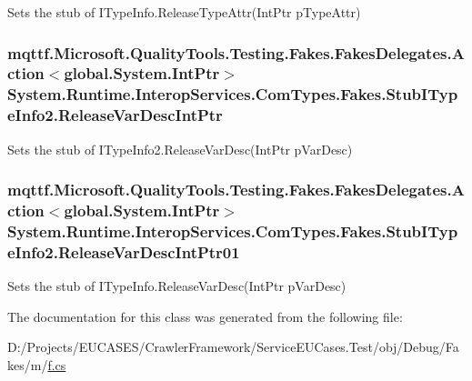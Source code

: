 Sets the stub of I\-Type\-Info.\-Release\-Type\-Attr(\-Int\-Ptr p\-Type\-Attr)

\hypertarget{class_system_1_1_runtime_1_1_interop_services_1_1_com_types_1_1_fakes_1_1_stub_i_type_info2_a75be579e4ef3a6c2a0ac4fc3764b92a9}{
\subsubsection[{Release\-Var\-Desc\-Int\-Ptr}]{\setlength{\rightskip}{0pt plus 5cm}mqttf.\-Microsoft.\-Quality\-Tools.\-Testing.\-Fakes.\-Fakes\-Delegates.\-Action$<$global.\-System.\-Int\-Ptr$>$ System.\-Runtime.\-Interop\-Services.\-Com\-Types.\-Fakes.\-Stub\-I\-Type\-Info2.\-Release\-Var\-Desc\-Int\-Ptr}}\label{class_system_1_1_runtime_1_1_interop_services_1_1_com_types_1_1_fakes_1_1_stub_i_type_info2_a75be579e4ef3a6c2a0ac4fc3764b92a9}


Sets the stub of I\-Type\-Info2.\-Release\-Var\-Desc(\-Int\-Ptr p\-Var\-Desc)

\hypertarget{class_system_1_1_runtime_1_1_interop_services_1_1_com_types_1_1_fakes_1_1_stub_i_type_info2_a44cfbb6ffccd0f74fb1a6152d65ae9fa}{
\subsubsection[{Release\-Var\-Desc\-Int\-Ptr01}]{\setlength{\rightskip}{0pt plus 5cm}mqttf.\-Microsoft.\-Quality\-Tools.\-Testing.\-Fakes.\-Fakes\-Delegates.\-Action$<$global.\-System.\-Int\-Ptr$>$ System.\-Runtime.\-Interop\-Services.\-Com\-Types.\-Fakes.\-Stub\-I\-Type\-Info2.\-Release\-Var\-Desc\-Int\-Ptr01}}\label{class_system_1_1_runtime_1_1_interop_services_1_1_com_types_1_1_fakes_1_1_stub_i_type_info2_a44cfbb6ffccd0f74fb1a6152d65ae9fa}


Sets the stub of I\-Type\-Info.\-Release\-Var\-Desc(\-Int\-Ptr p\-Var\-Desc)



The documentation for this class was generated from the following file\-:\begin{DoxyCompactItemize}
\item 
D\-:/\-Projects/\-E\-U\-C\-A\-S\-E\-S/\-Crawler\-Framework/\-Service\-E\-U\-Cases.\-Test/obj/\-Debug/\-Fakes/m/\hyperlink{m_2f_8cs}{f.\-cs}\end{DoxyCompactItemize}
